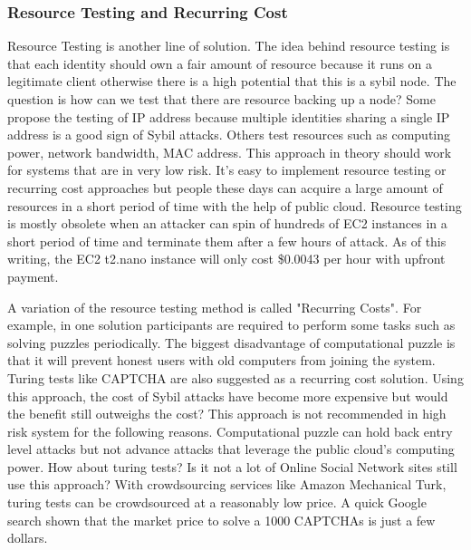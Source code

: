 \documentclass[conference]{IEEEtran}
\begin{document}
\subsubsection{Resource Testing and Recurring Cost}
Resource Testing is another line of solution. The idea behind resource testing is that each identity should own a fair amount of resource because it runs on a 
legitimate client otherwise there is a high potential that this is a sybil node. The question is how can we test that there are resource backing up a node? 
Some propose the testing of IP address because multiple identities sharing a single IP address is a good sign of Sybil attacks. 
Others test resources such as computing power, network bandwidth, MAC address. This approach in theory should work for systems that are in very low risk. 
It’s easy to implement resource testing or recurring cost approaches but people these days can acquire a large amount of resources in a short period of time with the help of public cloud.
Resource testing is mostly obsolete when an attacker can spin of hundreds of EC2 instances in a short period of time and terminate them after a few hours of attack. 
As of this writing, the EC2 t2.nano instance will only cost \$0.0043 per hour with upfront payment.


A variation of the resource testing method is called "Recurring Costs". For example, in one solution participants are required to perform some tasks such as solving puzzles\cite{Borisov06CPS} periodically. The biggest disadvantage of computational puzzle is that it will prevent honest users with old computers from joining the system. Turing tests like CAPTCHA are also suggested as a recurring cost solution\cite{Ahn03CUH}. Using this approach, the cost of Sybil attacks have become more expensive but would the benefit still outweighs the cost? This approach is not recommended in high risk system for the following reasons. Computational puzzle can hold back entry level attacks but not advance attacks that leverage the public cloud's computing power. How about turing tests? Is it not a lot of Online Social Network sites still use this approach? With crowdsourcing services like Amazon Mechanical Turk, turing tests can be crowdsourced at a reasonably low price. A quick Google search shown that the market price to solve a 1000 CAPTCHAs is just a few dollars.
\end{document}
